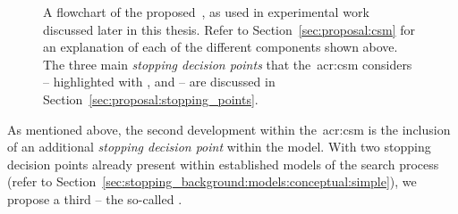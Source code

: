 \begin{figure}[t!]
    \centering
    \caption[The Complex Searcher Model]{A flowchart of the proposed~, as used in experimental work discussed later in this thesis. Refer to Section~\ref{sec:proposal:csm} for an explanation of each of the different components shown above. The three main \emph{stopping decision points} that the~\gls{acr:csm} considers – highlighted with ,  and  – are discussed in Section~\ref{sec:proposal:stopping_points}.}
    \label{fig:csm}
\end{figure}

\noindent
{} As mentioned above, the second development within the~\gls{acr:csm} is the inclusion of an additional \emph{stopping decision point} within the model. With two stopping decision points already present within established models of the search process (refer to Section~\ref{sec:stopping_background:models:conceptual:simple}), we propose a third -- the so-called .

